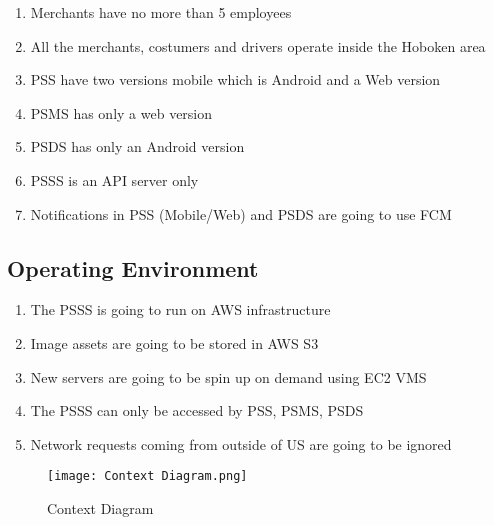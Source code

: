 \pagebreak

\begin{enumerate}[resume, label=AS-\arabic*]
    \item Merchants have no more than 5 employees
    \item All the merchants, costumers and drivers operate inside the 
    Hoboken area
    \item PSS have two versions mobile which is Android and a Web version
    \item PSMS has only a web version
    \item PSDS has only an Android version
    \item PSSS is an API server only
    \item Notifications in PSS (Mobile/Web) and PSDS are going to use FCM
\end{enumerate}

\pagebreak

\subsection{Operating Environment}
\begin{enumerate}[label=OE-\arabic*]
    \item The PSSS is going to run on AWS infrastructure
    \item Image assets are going to be stored in AWS S3
    \item New servers are going to be spin up on demand using EC2 VMS
    \item The PSSS can only be accessed by PSS, PSMS, PSDS 
    \item Network requests coming from outside of US are going to be ignored
\end{enumerate}
\begin{figure}[!htb]
    \centering
    \texttt{[image: Context Diagram.png]}
    \caption{Context Diagram}
\end{figure}